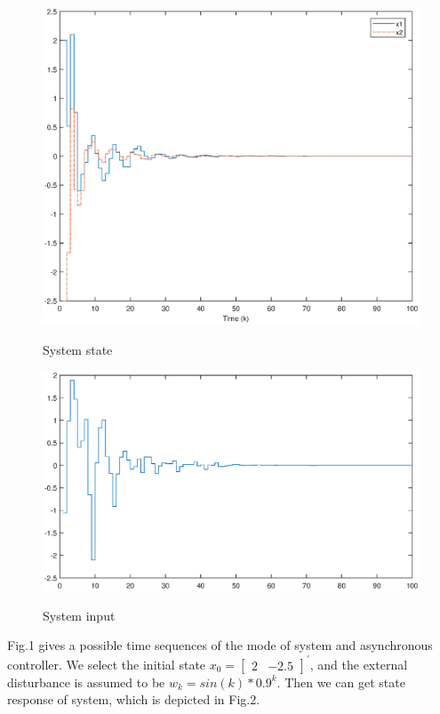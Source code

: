 \documentclass[conference]{IEEEtran}
\begin{document}
\begin{figure}[!htb]
	\centering\includegraphics[scale=0.4]{./simulink/state_new.eps}\\
	\caption{System state}
	\label{fig.2}
\end{figure}
\begin{figure}[!htb]
	\centering\includegraphics[scale=0.4]{./simulink/u_k3.eps}\\
	\caption{System input}
	\label{fig.3}
\end{figure}
Fig.1 gives a possible time sequences of the mode of system and asynchronous controller. We select the initial state $x_{0}=\begin{bmatrix}
	2&-2.5
\end{bmatrix}^{'}$, and the external disturbance is assumed to be $w_{k} = sin(k)*0.9^{k}$. Then we can get state response of system, which is depicted in Fig.2.
\end{document}
